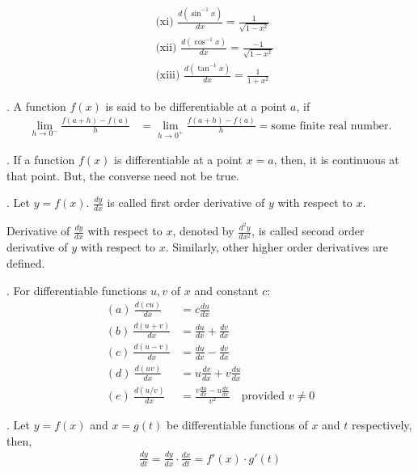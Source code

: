


\begin{align*}
& \text{(xi) } \frac{d(\sin^{-1} x)}{dx} = \frac{1}{\sqrt{1 - x^2}} \\
& \text{(xii) } \frac{d(\cos^{-1} x)}{dx} = \frac{-1}{\sqrt{1 - x^2}} \\
& \text{(xiii) } \frac{d(\tan^{-1} x)}{dx} = \frac{1}{1 + x^2}
\end{align*}

. A function \( f(x) \) is said to be differentiable at a point \( a \), if
\begin{align*}
\lim_{h \to 0^-} \frac{f(a + h) - f(a)}{h} &= \lim_{h \to 0^+} \frac{f(a + h) - f(a)}{h} = \text{some finite real number}.
\end{align*}

. If a function \( f(x) \) is differentiable at a point \( x = a \), then, it is continuous at that point. But, the converse need not be true.

. Let \( y = f(x) \). \( \frac{dy}{dx} \) is called first order derivative of \( y \) with respect to \( x \).

Derivative of \( \frac{dy}{dx} \) with respect to \( x \), denoted by \( \frac{d^2 y}{dx^2} \), is called second order derivative of \( y \) with respect to \( x \). Similarly, other higher order derivatives are defined.

. For differentiable functions \( u, v \) of \( x \) and constant \( c \):
\begin{align*}
(a) \ \frac{d(cu)}{dx} &= c \frac{du}{dx} \\
(b) \ \frac{d(u+v)}{dx} &= \frac{du}{dx} + \frac{dv}{dx} \\
(c) \ \frac{d(u-v)}{dx} &= \frac{du}{dx} - \frac{dv}{dx} \\
(d) \ \frac{d(uv)}{dx} &= u \frac{dv}{dx} + v \frac{du}{dx} \\
(e) \ \frac{d(u/v)}{dx} &= \frac{v \frac{du}{dx} - u \frac{dv}{dx}}{v^2} \quad \text{provided } v \ne 0
\end{align*}

. Let \( y = f(x) \) and \( x = g(t) \) be differentiable functions of \( x \) and \( t \) respectively, then,
\begin{align*}
\frac{dy}{dt} = \frac{dy}{dx} \cdot \frac{dx}{dt} = f'(x) \cdot g'(t)
\end{align*}


